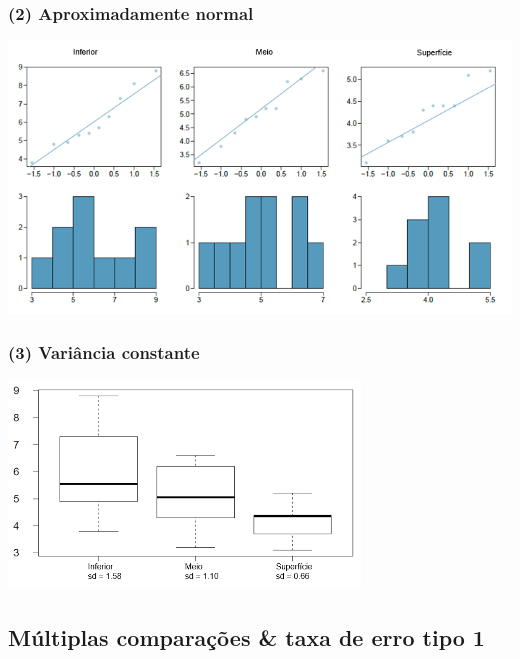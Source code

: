 
\begin{frame}[fragile]
\frametitle{(2) Aproximadamente normal}
\justifying
{}

\begin{center}
\includegraphics[width=\textwidth]{5-5_anova/normal.png}
\end{center}

\end{frame}


\begin{frame}[fragile]
\frametitle{(3) Variância constante}
\justifying
{}

\begin{center}
\includegraphics[width=0.7\textwidth]{5-5_anova/homo.png}
\end{center}

\end{frame}


\subsection{Múltiplas comparações \& taxa de erro tipo 1}


